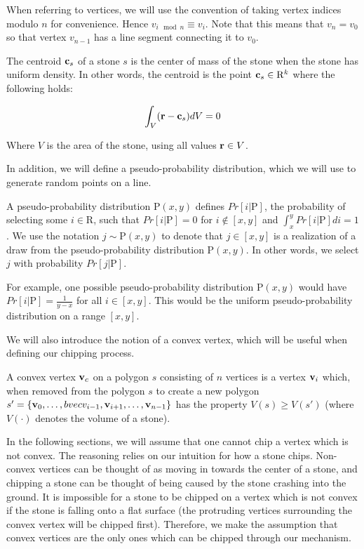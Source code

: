 When referring to vertices, we will use the convention of taking vertex indices modulo $n$ for convenience. Hence $v_{i \mod{n}} \equiv v_i$. Note that this means that $v_{n} = v_{0}$ so that vertex $v_{n-1}$ has a line segment connecting it to $v_{0}$.

The centroid $\mathbf{c}_s$ of a stone $s$ is the center of mass of the stone when the stone has uniform density. In other words, the centroid is the point $\mathbf{c}_s \in \mathrm{R}^k$ where the following holds:

\begin{eqnarray}
 \int_V (\mathbf{r} - \mathbf{c}_s) dV = 0
\end{eqnarray}

Where $V$ is the area of the stone, using all values $\mathbf{r} \in V$. 

In addition, we will define a pseudo-probability distribution, which we will use to generate random points on a line.

\begin{definition}
  A pseudo-probability distribution $\mathrm{P}(x, y)$ defines $Pr[i | \mathrm{P}]$, the probability of selecting some $i \in \mathrm{R}$, such that $Pr[i | \mathrm{P}] = 0$ for $i \notin [x,y]$ and $\int_{x}^y Pr[i | \mathrm{P}] di = 1$. We use the notation $j \sim \mathrm{P}(x,y)$ to denote that $j \in [x,y]$ is a realization of a draw from the pseudo-probability distribution $\mathrm{P}(x,y)$. In other words, we select $j$ with probability $Pr[j | \mathrm{P}]$.
\end{definition}

For example, one possible pseudo-probability distribution $\mathrm{P}(x,y)$ would have $Pr[i | \mathrm{P}] = \frac{1}{y-x}$ for all $i \in [x,y]$. This would be the uniform pseudo-probability distribution on a range $[x,y]$.

We will also introduce the notion of a convex vertex, which will be useful when defining our chipping process.

\begin{definition}
  A convex vertex $\mathbf{v}_c$ on a polygon $s$ consisting of $n$ vertices is a vertex $\mathbf{v}_i$ which, when removed from the polygon $s$ to create a new polygon $s' = \{ \mathbf{v}_0, \ldots, bvec{v}_{i-1}, \mathbf{v}_{i+1}, \ldots, \mathbf{v}_{n-1} \}$ has the property $V(s) \geq V(s')$ (where $V(\cdot)$ denotes the volume of a stone).
\end{definition}

In the following sections, we will assume that one cannot chip a vertex which is not convex. The reasoning relies on our intuition for how a stone chips. Non-convex vertices can be thought of as moving in towards the center of a stone, and chipping a stone can be thought of being caused by the stone crashing into the ground. It is impossible for a stone to be chipped on a vertex which is not convex if the stone is falling onto a flat surface (the protruding vertices surrounding the convex vertex will be chipped first). Therefore, we make the assumption that convex vertices are the only ones which can be chipped through our mechanism.

